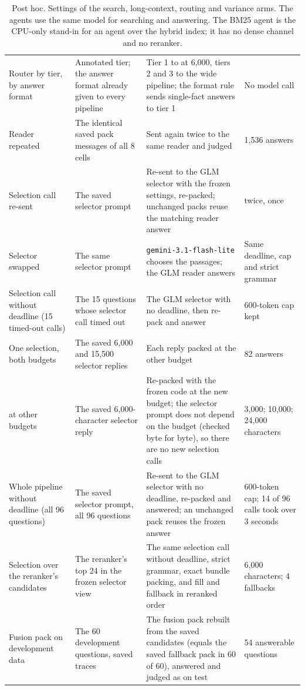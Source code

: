 \begin{table}[t]
\begin{tabularx}{\textwidth}{@{}p{2.6cm}p{2.9cm}Xp{2.8cm}@{}}
Router by tier, by answer format & Annotated tier; the answer format already given to every pipeline & Tier 1 to \hybrid{} at 6,000, tiers 2 and 3 to the wide pipeline; the format rule sends single-fact answers to tier 1 & No model call \\
Reader repeated & The identical saved pack messages of all 8 cells & Sent again twice to the same reader and judged & 1,536 answers \\
Selection call re-sent & The saved selector prompt & Re-sent to the GLM selector with the frozen settings, re-packed; unchanged packs reuse the matching reader answer & \lexb{} twice, \setr{} once \\
Selector swapped & The same selector prompt & \texttt{gemini-3.1-flash-lite} chooses the passages; the GLM reader answers & Same deadline, cap and strict grammar \\
Selection call without deadline (15 timed-out calls) & The 15 questions whose selector call timed out & The GLM selector with no deadline, then re-pack and answer & 600-token cap kept \\
One selection, both budgets & The saved 6,000 and 15,500 selector replies & Each reply packed at the other budget & 82 answers \\
\lexb{} at other budgets & The saved 6,000-character selector reply & Re-packed with the frozen code at the new budget; the selector prompt does not depend on the budget (checked byte for byte), so there are no new selection calls & 3,000; 10,000; 24,000 characters \\
Whole pipeline without deadline (all 96 questions) & The saved selector prompt, all 96 questions & Re-sent to the GLM selector with no deadline, re-packed and answered; an unchanged pack reuses the frozen answer & 600-token cap; 14 of 96 calls took over 3 seconds \\
Selection over the reranker's candidates & The reranker's top 24 in the frozen selector view & The same selection call without deadline, strict grammar, exact bundle packing, and fill and fallback in reranked order & 6,000 characters; 4 fallbacks \\
Fusion pack on development data & The 60 development questions, saved \lexb{} traces & The fusion pack rebuilt from the saved candidates (equals the saved fallback pack in 60 of 60), answered and judged as on test & 54 answerable questions \\
\bottomrule
\end{tabularx}
\caption{Post hoc. Settings of the search, long-context, routing and variance arms. The agents use the same model for searching and answering. The BM25 agent is the CPU-only stand-in for an agent over the hybrid index; it has no dense channel and no reranker.}
\label{tab:posthoc-settings2}
\end{table}

